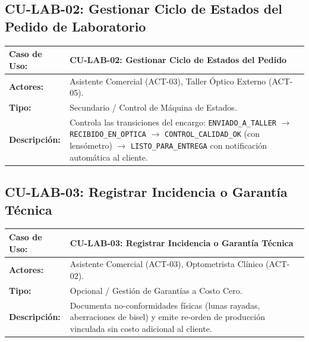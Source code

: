 \documentclass[12pt,a4paper]{report}
\begin{document}
\subsection{CU-LAB-02: Gestionar Ciclo de Estados del Pedido de Laboratorio}
\begin{table}[H]
\centering
\small
\begin{tabularx}{\textwidth}{|L{3.5cm}|X|}
\hline
{}\color{white}\textbf{Caso de Uso:} & \textbf{CU-LAB-02: Gestionar Ciclo de Estados del Pedido} \\
\hline
\textbf{Actores:} & Asistente Comercial (ACT-03), Taller Óptico Externo (ACT-05). \\
\hline
\textbf{Tipo:} & Secundario / Control de Máquina de Estados. \\
\hline
\textbf{Descripción:} & Controla las transiciones del encargo: \texttt{ENVIADO\_A\_TALLER} $\to$ \texttt{RECIBIDO\_EN\_OPTICA} $\to$ \texttt{CONTROL\_CALIDAD\_OK} (con lensómetro) $\to$ \texttt{LISTO\_PARA\_ENTREGA} con notificación automática al cliente. \\
\hline
\end{tabularx}
\end{table}

\subsection{CU-LAB-03: Registrar Incidencia o Garantía Técnica}
\begin{table}[H]
\centering
\small
\begin{tabularx}{\textwidth}{|L{3.5cm}|X|}
\hline
{}\color{white}\textbf{Caso de Uso:} & \textbf{CU-LAB-03: Registrar Incidencia o Garantía Técnica} \\
\hline
\textbf{Actores:} & Asistente Comercial (ACT-03), Optometrista Clínico (ACT-02). \\
\hline
\textbf{Tipo:} & Opcional / Gestión de Garantías a Costo Cero. \\
\hline
\textbf{Descripción:} & Documenta no-conformidades físicas (lunas rayadas, aberraciones de bisel) y emite re-orden de producción vinculada sin costo adicional al cliente. \\
\hline
\end{tabularx}
\end{table}

\newpage
\end{document}
